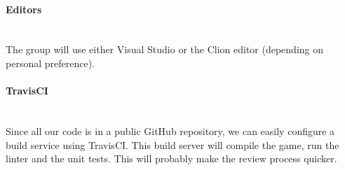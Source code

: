 \paragraph{Editors}
~\\ The group will use either Visual Studio or the Clion editor (depending on personal preference). 

\paragraph{TravisCI}
~\\ Since all our code is in a public GitHub repository, we can easily configure a build service using TravisCI. This build server will compile the game, run the linter and the unit tests. This will probably make the review process quicker.

